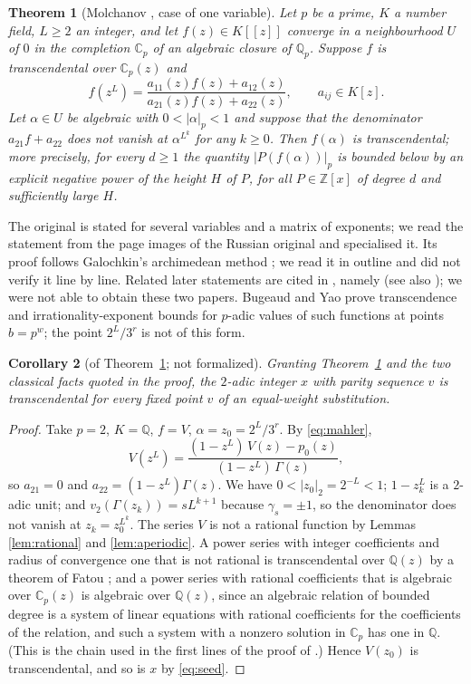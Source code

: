 \documentclass[11pt,reqno]{amsart}
\newtheorem{theorem}{Theorem}[section]
\newtheorem{corollary}[theorem]{Corollary}
\theoremstyle{definition}
\theoremstyle{remark}
\newcommand{\Z}{\mathbb{Z}}
\newcommand{\Q}{\mathbb{Q}}
\newcommand{\vt}{v_2}
\begin{document}
\begin{theorem}[Molchanov {\cite{Molchanov1983}}, case of one variable]%
\label{thm:molchanov}
Let $p$ be a prime, $K$ a number field, $L\ge 2$ an integer, and let
$f(z)\in K[[z]]$ converge in a neighbourhood $U$ of $0$ in the completion
$\mathbb C_p$ of an algebraic closure of $\Q_p$.  Suppose $f$ is
transcendental over $\mathbb C_p(z)$ and
\[
  f(z^{L})=\frac{a_{11}(z)f(z)+a_{12}(z)}{a_{21}(z)f(z)+a_{22}(z)},\qquad
  a_{ij}\in K[z].
\]
Let $\alpha\in U$ be algebraic with $0<|\alpha|_p<1$ and suppose that the
denominator $a_{21}f+a_{22}$ does not vanish at $\alpha^{L^{k}}$ for any
$k\ge 0$.  Then $f(\alpha)$ is transcendental; more precisely, for every
$d\ge 1$ the quantity $|P(f(\alpha))|_p$ is bounded below by an explicit
negative power of the height $H$ of $P$, for all $P\in\Z[x]$ of degree $d$
and sufficiently large $H$.
\end{theorem}

The original is stated for several variables and a matrix of exponents; we
read the statement from the page images of the Russian original and
specialised it.  Its proof follows Galochkin's archimedean method
\cite{Galochkin1980}; we read it in outline and did not verify it line by
line.  Related later statements are cited in \cite{BugeaudYao2017}, namely
\cite{WangXu2006} (see also \cite{Wang2006}); we were not able to obtain
these two papers.  Bugeaud and Yao \cite[Theorem~3.1]{BugeaudYao2017} prove
transcendence and irrationality-exponent bounds for $p$-adic values of such
functions at points $b=p^{w}$; the point $2^{L}/3^{r}$ is not of this form.

\begin{corollary}[of Theorem~\ref{thm:molchanov}; not formalized]%
\label{cor:transcendental}
Granting Theorem~\ref{thm:molchanov} and the two classical facts quoted in
the proof, the $2$-adic integer $x$ with parity sequence $v$ is
transcendental for every fixed point $v$ of an equal-weight substitution.
\end{corollary}

\begin{proof}
Take $p=2$, $K=\Q$, $f=V$, $\alpha=z_0=2^{L}/3^{r}$.  By \eqref{eq:mahler},
\[
  V(z^{L})=\frac{(1-z^{L})\,V(z)-p_0(z)}{(1-z^{L})\,\Gamma(z)},
\]
so $a_{21}=0$ and $a_{22}=(1-z^{L})\Gamma(z)$.  We have
$0<|z_0|_2=2^{-L}<1$; $1-z_k^{L}$ is a $2$-adic unit; and
$\vt(\Gamma(z_k))=sL^{k+1}$ because $\gamma_s=\pm1$, so the denominator does
not vanish at $z_k=z_0^{L^{k}}$.  The series $V$ is not a rational function
by Lemmas \ref{lem:rational} and \ref{lem:aperiodic}.  A power series with
integer coefficients and radius of convergence one that is not rational is
transcendental over $\Q(z)$ by a theorem of Fatou \cite{Fatou1906}; and a
power series with rational coefficients that is algebraic over
$\mathbb C_p(z)$ is algebraic over $\Q(z)$, since an algebraic relation of
bounded degree is a system of linear equations with rational coefficients
for the coefficients of the relation, and such a system with a nonzero
solution in $\mathbb C_p$ has one in $\Q$.  (This is the chain used in the
first lines of the proof of \cite[Theorem~3.1]{BugeaudYao2017}.)  Hence
$V(z_0)$ is transcendental, and so is $x$ by \eqref{eq:seed}.
\end{proof}
\end{document}
